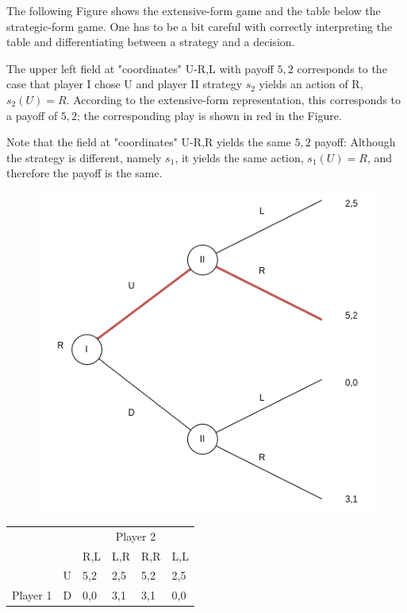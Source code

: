 The following Figure shows the extensive-form game and the table below the strategic-form game. One has to be a bit careful with correctly interpreting the table and differentiating between a strategy and a decision.

The upper left field at "coordinates" U-R,L with payoff $5,2$ corresponds to the case that player I chose U and player II strategy $s_2$ yields an action of R, $s_2(U) = R$. According to the extensive-form representation, this corresponds to a payoff of $5,2$; the corresponding play is shown in red in the Figure. 

Note that the field at "coordinates" U-R,R yields the same $5,2$ payoff: Although the strategy is different, namely $s_1$, it yields the same action, $s_1(U) = R$, and therefore the payoff is the same.

\begin{figure}[H]
    \centering
    \includegraphics[scale=0.5]{images/2023-10-10-game_theory_07.png}
\end{figure}

\begin{table}[H]
	\begin{tabular}{llllll}
		&   & \multicolumn{4}{c}{Player 2}                                      \\ \cline{2-6} 
\multicolumn{1}{l|}{}                           &   & R,L                        & L,R & R,R & \multicolumn{1}{l|}{L,L} \\ \cline{2-6} 
\multicolumn{1}{c|}{}                           & U & {\color[HTML]{FE0000} 5,2} & 2,5 & 5,2 & \multicolumn{1}{l|}{2,5} \\
\multicolumn{1}{c|}{\multirow{-2}{*}{Player 1}} & D & 0,0                        & 3,1 & 3,1 & \multicolumn{1}{l|}{0,0} \\ \cline{2-6} 
\end{tabular}
\end{table}

